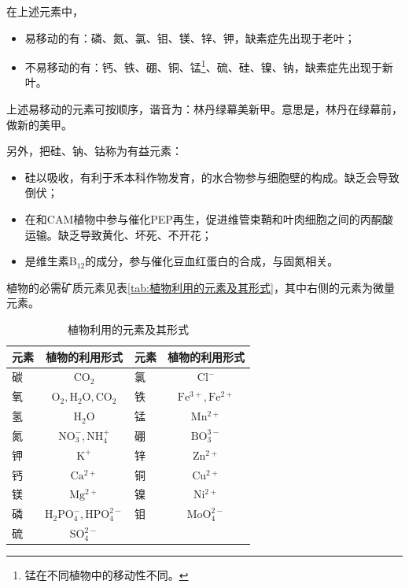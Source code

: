 在上述元素中，
\begin{itemize}
	\item 易移动的有：磷、氮、氯、钼、镁、锌、钾，缺素症先出现于老叶；
	\item 不易移动的有：钙、铁、硼、铜、锰\footnote{锰在不同植物中的移动性不同。}、硫、硅、镍、钠，缺素症先出现于新叶。
\end{itemize}

\begin{qj}[：易移动的元素记忆法]
	上述易移动的元素可按顺序，谐音为：林丹绿幕美新甲。意思是，林丹在绿幕前，做新的美甲。
\end{qj}

另外，把硅、钠、钴称为有益元素：

\begin{itemize}
	\item 硅以吸收，有利于禾本科作物发育，的水合物参与细胞壁的构成。缺乏会导致倒伏；
	\item {}在和CAM植物中参与催化PEP再生，促进维管束鞘和叶肉细胞之间的丙酮酸运输。缺乏导致黄化、坏死、不开花；
	\item {}是维生素B$_{12}$的成分，参与催化豆血红蛋白的合成，与固氮相关。
\end{itemize}

植物的必需矿质元素见表\autoref{tab:植物利用的元素及其形式}，其中右侧的元素为微量元素。

\begin{table}[htbp]
	\centering
	\begin{tabularx}{\textwidth}{|>{\centering\arraybackslash}m{3em}|C||>{\centering\arraybackslash}m{3em}|C|}
		\hline
		\textbf{元素} & \textbf{植物的利用形式} & \textbf{元素} & \textbf{植物的利用形式} \\ \hline
		碳  & $ \mathrm{CO_2} $                & 氯  & $ \mathrm{Cl^-} $                \\ \hline
		氧  & $ \mathrm{O_2}, \mathrm{H_2O}, \mathrm{CO_2} $       & 铁  & $ \mathrm{Fe^{3+}}, \mathrm{Fe^{2+}} $        \\ \hline
		氢  & $ \mathrm{H_2O} $                & 锰  & $ \mathrm{Mn^{2+}} $               \\ \hline
		氮  & $ \mathrm{NO_3^-}, \mathrm{NH_4^+} $        & 硼  & $ \mathrm{BO_3^{3-}} $              \\ \hline
		钾  & $ \mathrm{K^+} $                 & 锌  & $ \mathrm{Zn^{2+}} $               \\ \hline
		钙  & $ \mathrm{Ca^{2+}} $               & 铜  & $ \mathrm{Cu^{2+}} $               \\ \hline
		镁  & $ \mathrm{Mg^{2+}} $               & 镍  & $ \mathrm{Ni^{2+}} $               \\ \hline
		磷  & $ \mathrm{H_2PO_4^-}, \mathrm{HPO_4^{2-}} $    & 钼  & $ \mathrm{MoO_4^{2-}} $             \\ \hline
		硫  & $ \mathrm{SO_4^{2-}} $              &  &  \\ \hline
	\end{tabularx}
	\caption{植物利用的元素及其形式}
	\label{tab:植物利用的元素及其形式}
\end{table}

